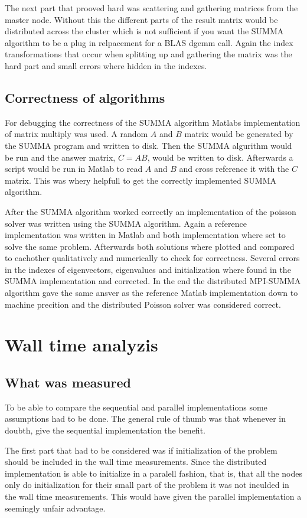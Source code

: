 \documentclass{article}
\begin{document}
The next part that prooved hard was scattering and gathering matrices from the master node.
Without this the different parts of the result matrix would be distributed across the cluster
which is not sufficient if you want the SUMMA algorithm to be a plug in relpacement for a
BLAS dgemm call. Again the index transformations that occur when splitting up and gathering
the matrix was the hard part and small errors where hidden in the indexes.

\subsection{Correctness of algorithms}
For debugging the correctness of the SUMMA algorithm Matlabs implementation of
matrix multiply was used. A random $A$ and $B$ matrix would be generated by the
SUMMA program and written to disk. Then the SUMMA algurithm would be run and the
answer matrix, $C = A B$, would be written to disk. Afterwards a script would be
run in Matlab to read $A$ and $B$ and cross reference it with the $C$ matrix.
This was whery helpfull to get the correctly implemented SUMMA algorithm.

After the SUMMA algorithm worked correctly an implementation of the poisson solver
was written using the SUMMA algorithm. Again a reference implementation was written
in Matlab and both implementation where set to solve the same problem. Afterwards
both solutions where plotted and compared to eachother qualitatively and numerically
to check for correctness. Several errors in the indexes of eigenvectors, eigenvalues
and initialization where found in the SUMMA implementation and corrected. In the end
the distributed MPI-SUMMA algorithm gave the same ansver as the reference Matlab implementation
down to machine precition and the distributed Poisson solver was considered correct.

\section{Wall time analyzis}

\subsection{What was measured}
To be able to compare the sequential and parallel implementations some assumptions had to
be done. The general rule of thumb was that whenever in doubth, give the sequential implementation
the benefit.

The first part that had to be considered was if initialization of the problem should be included
in the wall time measurements. Since the distributed implementation is able to initialize in
a paralell fashion, that is, that all the nodes only do initialization for their small part of the
problem it was not inculded in the wall time measurements. This would have given the parallel implementation
a seemingly unfair advantage.
\end{document}
